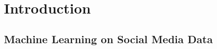 \documentclass[mksc,blindrev]{informs3} %
\begin{document}
\maketitle

%

  
\section{Introduction}

\subsection{Machine Learning on Social Media Data}
\end{document}
